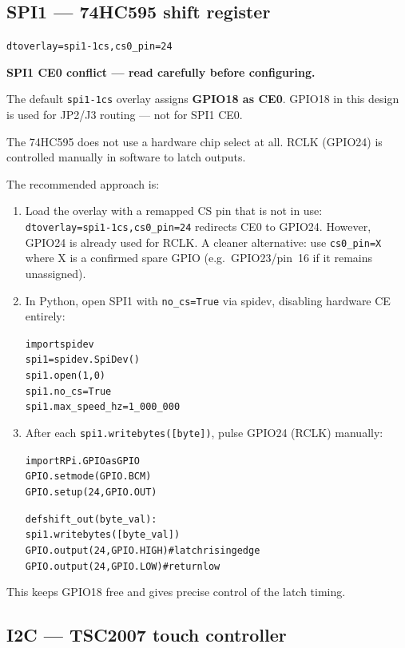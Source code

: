 \documentclass[11pt,a4paper]{article}
\begin{document}
\subsection{SPI1 --- 74HC595 shift register}
\label{sec:spi1config}

\begin{alltt}\small
dtoverlay=spi1-1cs,cs0_pin=24
\end{alltt}

\begin{warnbox}
\textbf{SPI1 CE0 conflict --- read carefully before configuring.}

The default \texttt{spi1-1cs} overlay assigns \textbf{GPIO18 as CE0}.
GPIO18 in this design is used for JP2/J3 routing --- not for SPI1 CE0.

The 74HC595 does not use a hardware chip select at all.
RCLK (GPIO24) is controlled manually in software to latch outputs.

The recommended approach is:
\begin{enumerate}[noitemsep]
  \item Load the overlay with a remapped CS pin that is not in use:
        \texttt{dtoverlay=spi1-1cs,cs0\_pin=24} redirects CE0 to GPIO24.
        However, GPIO24 is already used for RCLK.
        A cleaner alternative: use \texttt{cs0\_pin=X} where X is a confirmed
        spare GPIO (e.g.\ GPIO23/pin~16 if it remains unassigned).
  \item In Python, open SPI1 with \texttt{no\_cs=True} via spidev,
        disabling hardware CE entirely:
\begin{alltt}\small
import spidev
spi1 = spidev.SpiDev()
spi1.open(1, 0)
spi1.no_cs = True
spi1.max_speed_hz = 1_000_000
\end{alltt}
  \item After each \texttt{spi1.writebytes([byte])}, pulse GPIO24 (RCLK) manually:
\begin{alltt}\small
import RPi.GPIO as GPIO
GPIO.setmode(GPIO.BCM)
GPIO.setup(24, GPIO.OUT)

def shift_out(byte_val):
    spi1.writebytes([byte_val])
    GPIO.output(24, GPIO.HIGH)   # latch rising edge
    GPIO.output(24, GPIO.LOW)    # return low
\end{alltt}
\end{enumerate}
This keeps GPIO18 free and gives precise control of the latch timing.
\end{warnbox}

\subsection{I2C --- TSC2007 touch controller}
\end{document}
